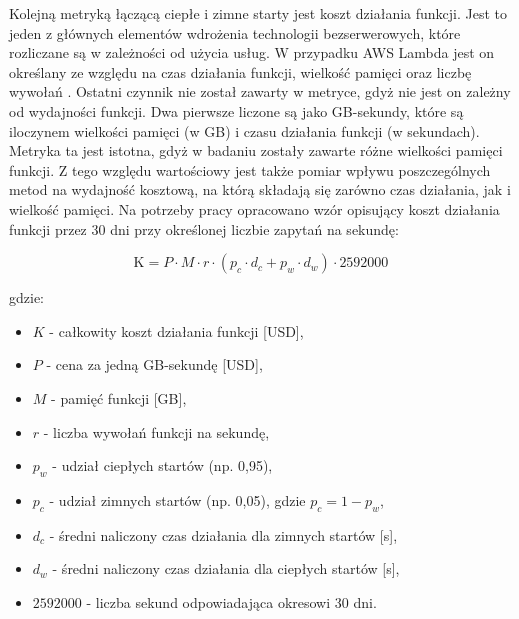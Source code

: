 Kolejną metryką łączącą ciepłe i zimne starty jest koszt działania funkcji.
Jest to jeden z głównych elementów wdrożenia technologii bezserwerowych, które rozliczane są w zależności od użycia usług.
W przypadku AWS Lambda jest on określany ze względu na czas działania funkcji, wielkość pamięci oraz liczbę wywołań \cite{awsLambdaPricing}.
Ostatni czynnik nie został zawarty w metryce, gdyż nie jest on zależny od wydajności funkcji.
Dwa pierwsze liczone są jako GB-sekundy, które są iloczynem wielkości pamięci (w GB) i czasu działania funkcji (w sekundach).
Metryka ta jest istotna, gdyż w badaniu zostały zawarte różne wielkości pamięci funkcji.
Z tego względu wartościowy jest także pomiar wpływu poszczególnych metod na wydajność kosztową, na którą składają się zarówno czas działania, jak i wielkość pamięci.
Na potrzeby pracy opracowano wzór opisujący koszt działania funkcji przez 30 dni przy określonej liczbie zapytań na sekundę:

\[
\text{K} = P \cdot M \cdot  r \cdot \left( p_c \cdot d_c + p_w \cdot d_w \right) \cdot 2592000
\]

gdzie:
\begin{itemize}
  \item \( K \) - całkowity koszt działania funkcji [USD],
  \item \( P \) - cena za jedną GB-sekundę [USD],
  \item \( M \) - pamięć funkcji [GB],
  \item \( r \) - liczba wywołań funkcji na sekundę,
  \item \( p_w \) - udział ciepłych startów (np. 0,95),
  \item \( p_c \) - udział zimnych startów (np. 0,05), gdzie \( p_c = 1 - p_w \),
  \item \( d_c \) - średni naliczony czas działania dla zimnych startów [s],
  \item \( d_w \) - średni naliczony czas działania dla ciepłych startów [s],
  \item \( 2592000 \) - liczba sekund odpowiadająca okresowi 30 dni.
\end{itemize}

